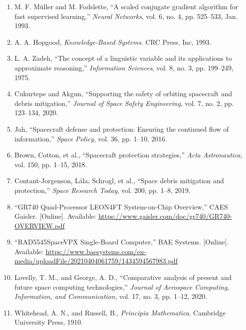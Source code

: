 \documentclass[a4paper,12pt]{article}
\begin{document}
\begin{enumerate}
    \item M. F. M\"uller and M. Fodslette, ``A scaled conjugate gradient algorithm for fast supervised learning,'' \textit{Neural Networks}, vol. 6, no. 4, pp. 525--533, Jan. 1993.
    
    \item A. A. Hopgood, \textit{Knowledge-Based Systems}. CRC Press, Inc, 1993.
    
    \item L. A. Zadeh, ``The concept of a linguistic variable and its applications to approximate reasoning,'' \textit{Information Sciences}, vol. 8, no. 3, pp. 199--249, 1975.
    
    \item Cukurtepe and Akgun, ``Supporting the safety of orbiting spacecraft and debris mitigation,'' \textit{Journal of Space Safety Engineering}, vol. 7, no. 2, pp. 123--134, 2020.
    
    \item Jah, ``Spacecraft defense and protection: Ensuring the continued flow of information,'' \textit{Space Policy}, vol. 36, pp. 1--10, 2016.
    
    \item Brown, Cotton, et al., ``Spacecraft protection strategies,'' \textit{Acta Astronautica}, vol. 150, pp. 1--15, 2018.
    
    \item Contant-Jorgenson, Lála, Schrogl, et al., ``Space debris mitigation and protection,'' \textit{Space Research Today}, vol. 200, pp. 1--8, 2019.
    
    \item ``GR740 Quad-Processor LEON4FT System-on-Chip Overview,'' CAES Gaisler. [Online]. Available: \url{https://www.gaisler.com/doc/gr740/GR740-OVERVIEW.pdf}
    
    \item ``RAD5545\texttrademark SpaceVPX Single-Board Computer,'' BAE Systems. [Online]. Available: \url{https://www.baesystems.com/en-media/uploadFile/20210404061759/1434594567983.pdf}
    
    \item Lovelly, T. M., and George, A. D., ``Comparative analysis of present and future space computing technologies,'' \textit{Journal of Aerospace Computing, Information, and Communication}, vol. 17, no. 3, pp. 1--12, 2020.
    
    \item Whitehead, A. N., and Russell, B., \textit{Principia Mathematica}. Cambridge University Press, 1910.
    

\end{enumerate}
\end{document}
